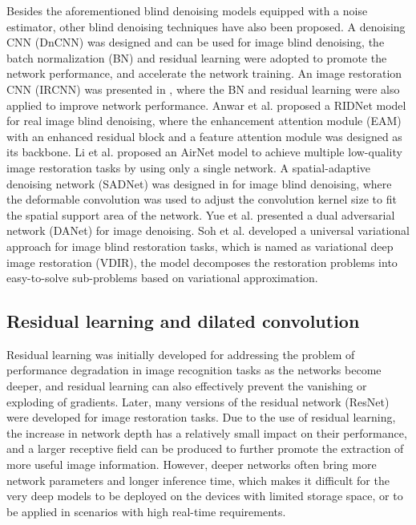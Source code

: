\documentclass[3p,times]{elsarticle}
\begin{document}
Besides the aforementioned blind denoising models equipped with a noise estimator, other blind denoising techniques have also been proposed. A denoising CNN (DnCNN) \cite{Zhang2017} was designed and can be used for image blind denoising, the batch normalization (BN) \cite{Ioffe2015} and residual learning \cite{He2016} were adopted to promote the network performance, and accelerate the network training. An image restoration CNN (IRCNN) was presented in \cite{ZhangZGZ2017}, where the BN and residual learning were also applied to improve network performance. Anwar et al. \cite{Anwar2019} proposed a RIDNet model for real image blind denoising, where the enhancement attention module (EAM) with an enhanced residual block and a feature attention module was designed as its backbone. Li et al. \cite{Li2022} proposed an AirNet model to achieve multiple low-quality image restoration tasks by using only a single network. A spatial-adaptive denoising network (SADNet) was designed in \cite{Chang2020} for image blind denoising, where the deformable convolution \cite{Dai2017, Zhu2019} was used to adjust the convolution kernel size to fit the spatial support area of the network. Yue et al. \cite{Yue2020} presented a dual adversarial network (DANet) for image denoising. Soh et al. \cite{Soh2022} developed a universal variational approach for image blind restoration tasks, which is named as variational deep image restoration (VDIR), the model decomposes the restoration problems into easy-to-solve sub-problems based on variational approximation.

\subsection{Residual learning and dilated convolution}
Residual learning \cite{He2016} was initially developed for addressing the problem of performance degradation in image recognition tasks as the networks become deeper, and residual learning can also effectively prevent the vanishing or exploding of gradients. Later, many versions of the residual network (ResNet) \cite{Zhang2021, Kim2016, ZhangT2018, Kokkinos2019} were developed for image restoration tasks. Due to the use of residual learning, the increase in network depth has a relatively small impact on their performance, and a larger receptive field can be produced to further promote the extraction of more useful image information. However, deeper networks often bring more network parameters and longer inference time, which makes it difficult for the very deep models to be deployed on the devices with limited storage space, or to be applied in scenarios with high real-time requirements.
\end{document}
